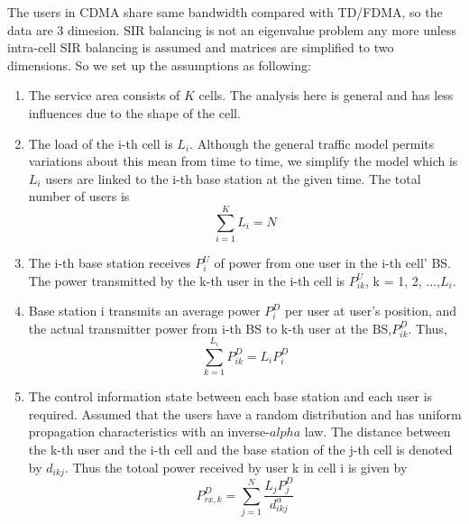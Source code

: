 \documentclass[conference]{IEEEtran}
\begin{document}
The users in CDMA share same bandwidth compared with TD/FDMA, so the data are 3 dimesion. SIR balancing is not an eigenvalue problem any more unless intra-cell SIR balancing is assumed and  matrices are simplified to two dimensions\cite{nettleton1983power}. So we set up the assumptions as following:              
\vspace*{3mm}
\begin{enumerate}
	\item The service area consists of $K$ cells. The analysis here is general and has less influences due to the shape of the cell.
	\item The load of the i-th cell is $L_{i}$. Although the general traffic model permits variations about this mean from time to time, we simplify the model which is $L_{i}$ users are linked to the i-th base station at the given time.
	The total number of users is  
	\begin{equation}
		\sum_{i=1}^{K} L_i = N
	\end{equation}
	\item The i-th base station receives $P^{U}_{i}$ of power from one user in the i-th cell' BS. The power transmitted by the k-th user in the i-th cell is $P^{U}_{ik}$, k = 1, 2, ...,$L_{i}$. 
	\item Base station i transmits an average power $P^{D}_{i}$ per user at user's position, and the actual transmitter power from i-th BS to k-th user at the BS,$P^{D}_{ik}$. Thus,
	\begin{equation}
	\sum_{k=1}^{L_i} P^{D}_{ik} = L_iP_i^D
	\end{equation}
	\item The control information state between each base station and each user is required. Assumed that the users have a random distribution and has uniform propagation characteristics with an inverse-$alpha$ law. The distance between the k-th user and the i-th cell and the base station of the j-th cell is denoted by $d_{ikj}$. Thus the totoal power received by user k in cell i is given by
	\begin{equation}
	 P_{rx,k}^D = \sum^N_{j=1} \frac{L_jP_j^D}{d^\alpha_{ikj}}
	\end{equation}
\end{enumerate}
\end{document}
